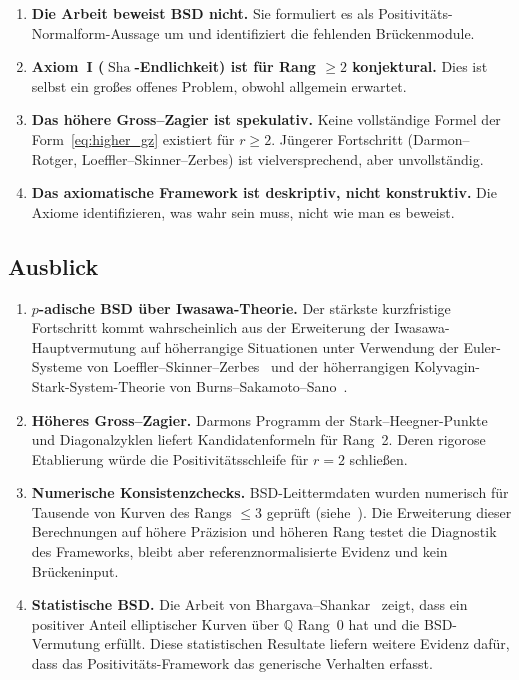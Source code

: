 \documentclass[aps,prd,twocolumn,superscriptaddress,nofootinbib,floatfix]{revtex4-2}
\theoremstyle{definition}
\theoremstyle{remark}
\DeclareMathOperator{\Sha}{Sha}
\begin{document}
\begin{enumerate}
\item \textbf{Die Arbeit beweist BSD nicht.} Sie formuliert es als Positivitäts-Normalform-Aussage um und identifiziert die fehlenden Brückenmodule.

\item \textbf{Axiom~I ($\Sha$-Endlichkeit) ist für Rang $\geq 2$ konjektural.} Dies ist selbst ein großes offenes Problem, obwohl allgemein erwartet.

\item \textbf{Das \glqq höhere Gross--Zagier\grqq{} ist spekulativ.} Keine vollständige Formel der Form~\eqref{eq:higher_gz} existiert für $r \geq 2$. Jüngerer Fortschritt (Darmon--Rotger, Loeffler--Skinner--Zerbes) ist vielversprechend, aber unvollständig.

\item \textbf{Das axiomatische Framework ist deskriptiv, nicht konstruktiv.} Die Axiome identifizieren, was wahr sein muss, nicht wie man es beweist.
\end{enumerate}

\subsection{Ausblick}

\begin{enumerate}
\item \textbf{$p$-adische BSD über Iwasawa-Theorie.} Der stärkste kurzfristige Fortschritt kommt wahrscheinlich aus der Erweiterung der Iwasawa-Hauptvermutung auf höherrangige Situationen unter Verwendung der Euler-Systeme von Loeffler--\allowbreak Skinner--\allowbreak Zerbes~\cite{LSZ2020} und der höherrangigen Kolyvagin-Stark-System-Theorie von Burns--\allowbreak Sakamoto--\allowbreak Sano~\cite{BurnsSano2021,BurnsSakamotoSano2025}.

\item \textbf{Höheres Gross--Zagier.} Darmons Programm der \glqq Stark--Heegner-Punkte\grqq{} und Diagonalzyklen liefert Kandidatenformeln für Rang~2. Deren rigorose Etablierung würde die Positivitätsschleife für $r = 2$ schließen.

\item \textbf{Numerische Konsistenzchecks.} BSD-Leittermdaten wurden numerisch für Tausende von Kurven des Rangs $\leq 3$ geprüft (siehe~\cite{LMFDB}). Die Erweiterung dieser Berechnungen auf höhere Präzision und höheren Rang testet die Diagnostik des Frameworks, bleibt aber referenznormalisierte Evidenz und kein Brückeninput.

\item \textbf{Statistische BSD.} Die Arbeit von Bhargava--Shankar~\cite{BhargavaShankar2015} zeigt, dass ein positiver Anteil elliptischer Kurven über $\mathbb{Q}$ Rang~0 hat und die BSD-Vermutung erfüllt. Diese statistischen Resultate liefern weitere Evidenz dafür, dass das Positivitäts-Framework das generische Verhalten erfasst.
\end{enumerate}
\end{document}
